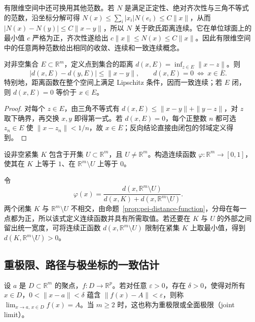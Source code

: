 有限维空间中还可换用其他范数。若 $N$ 是满足正定性、绝对齐次性与三角不等式的范数，沿坐标分解可得 $N(x)\le\sum_i|x_i|N(e_i)\le C\|x\|$，从而 $|N(x)-N(y)|\le C\|x-y\|$，所以 $N$ 关于欧氏距离连续。它在单位球面上的最小值 $c$ 严格为正，齐次性遂给出 $c\|x\|\le N(x)\le C\|x\|$。因此有限维空间中的任意两种范数给出相同的收敛、连续和一致连续概念。

\begin{proposition}
\label{prop:pei-distance-function}
对非空集合 $E\subset\mathbb R^m$，定义点到集合的距离 $d(x,E)=\inf_{z\in E}\|x-z\|$。则
\[
|d(x,E)-d(y,E)|\le\|x-y\|,\qquad d(x,E)=0\ \Longleftrightarrow\ x\in\overline E.
\]
特别地，距离函数在整个空间上满足 Lipschitz 条件，因而一致连续；若 $E$ 闭，则 $d(x,E)=0$ 等价于 $x\in E$。
\end{proposition}
\begin{proof}
对每个 $z\in E$，由三角不等式有 $d(x,E)\le\|x-y\|+\|y-z\|$，对 $z$ 取下确界，再交换 $x,y$ 即得第一式。若 $d(x,E)=0$，每个正整数 $n$ 都可选 $z_n\in E$ 使 $\|x-z_n\|<1/n$，故 $x\in\overline E$；反向结论直接由闭包的邻域定义得到。
\end{proof}

\begin{example}
设非空紧集 $K$ 包含于开集 $U\subset\mathbb R^m$，且 $U\ne\mathbb R^m$。构造连续函数 $\varphi:\mathbb R^m\to[0,1]$，使其在 $K$ 上等于 $1$、在 $\mathbb R^m\setminus U$ 上等于 $0$。
\end{example}
\begin{solve}
令
\[
\varphi(x)=\frac{d(x,\mathbb R^m\setminus U)}{d(x,K)+d(x,\mathbb R^m\setminus U)}.
\]
两个闭集 $K$ 与 $\mathbb R^m\setminus U$ 不相交，由命题~\ref{prop:pei-distance-function}，分母在每一点都为正，所以该式定义连续函数并具有所需取值。若还要在 $K$ 与 $U$ 的外部之间留出统一宽度，可将连续正函数 $d(x,\mathbb R^m\setminus U)$ 限制在紧集 $K$ 上取最小值，得到 $d(K,\mathbb R^m\setminus U)>0$。
\end{solve}

\subsection{重极限、路径与极坐标的一致估计}

\begin{definition}
设 $a$ 是 $D\subset\mathbb R^m$ 的聚点，$f:D\to\mathbb R^p$。若对任意 $\varepsilon>0$，存在 $\delta>0$，使得对所有 $x\in D$，$0<\|x-a\|<\delta$ 蕴含 $\|f(x)-A\|<\varepsilon$，则称 $\lim_{x\to a,\,x\in D}f(x)=A$。当 $m\ge2$ 时，这也称为重极限或全面极限（joint limit）。
\end{definition}

